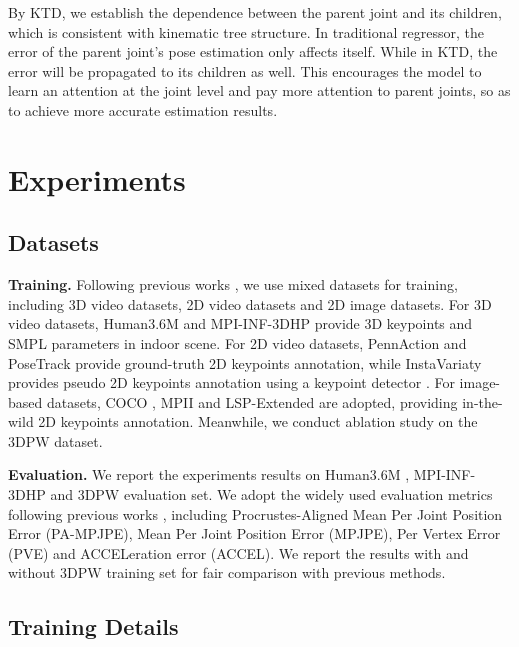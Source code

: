 \documentclass[10pt,twocolumn,letterpaper]{article}
\begin{document}
{{By KTD, we establish the dependence between the parent joint and its children, which is consistent with kinematic tree structure. In traditional regressor, the error of the parent joint's pose estimation only affects itself. While in KTD, the error will be propagated to its children as well. This encourages the model to learn an attention at the joint level and pay more attention to parent joints, so as to achieve more accurate estimation results.




\section{Experiments}

\subsection{Datasets}



\textbf{Training.} Following previous works \cite{hmr}\cite{spin}\cite{vibe}, we use mixed datasets for training, including 3D video datasets, 2D video datasets and 2D image datasets. For 3D video datasets, Human3.6M \cite{human3.6m} and MPI-INF-3DHP \cite{mpii3d} provide 3D keypoints and SMPL parameters in indoor scene. For 2D video datasets, PennAction \cite{pennaction} and PoseTrack \cite{posetrack} provide ground-truth 2D keypoints annotation, while InstaVariaty \cite{insta} provides pseudo 2D keypoints annotation using a keypoint detector \cite{detector1,multiposenet}. For image-based datasets, COCO \cite{coco}, MPII \cite{mpii} and LSP-Extended \cite{lspet} are adopted, providing in-the-wild 2D keypoints annotation. Meanwhile, we conduct ablation study on the 3DPW \cite{3dpw} dataset.

\textbf{Evaluation.} We report the experiments results on Human3.6M \cite{human3.6m}, MPI-INF-3DHP \cite{mpii3d} and 3DPW \cite{3dpw} evaluation set. We adopt the widely used evaluation metrics following previous works \cite{hmr}\cite{spin}\cite{vibe}, including Procrustes-Aligned Mean Per Joint Position Error (PA-MPJPE), Mean Per Joint Position Error (MPJPE), Per
Vertex Error (PVE) and ACCELeration error (ACCEL). We report the results with and without 3DPW \cite{3dpw} training set for fair comparison with previous methods.

\subsection{Training Details}

}}
\end{document}
